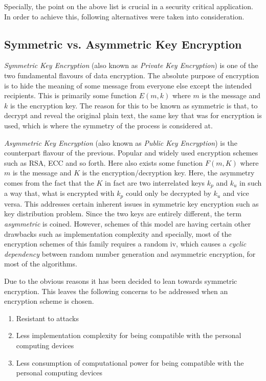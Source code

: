 Specially, the  point on the above list is crucial in a security critical application. In order to achieve this, following alternatives were taken into consideration.

\subsection{Symmetric vs. Asymmetric Key Encryption}

\textit{Symmetric Key Encryption} (also known as \textit{Private Key Encryption}) is one of the two fundamental flavours of data encryption. The absolute purpose of encryption is to hide the meaning of some message from everyone else except the intended recipients. This is primarily some function $E(m,k)$ where $m$ is the message and $k$ is the encryption key. The reason for this to be known as symmetric is that, to decrypt and reveal the original plain text, the same key that was for encryption is used, which is where the symmetry of the process is considered at.

\textit{Asymmetric Key Encryption} (also known as \textit{Public Key Encryption}) is the counterpart flavour of the previous. Popular and widely used encryption schemes such as RSA, ECC and so forth. Here also exists some function $F(m,K)$ where $m$ is the message and $K$ is the encryption/decryption key. Here, the asymmetry comes from the fact that the $K$ in fact are two interrelated keys $k_p$ and $k_u$ in such a way that, what is encrypted with $k_p$ could only be decrypted by $k_u$ and vice versa. This addresses certain inherent issues in symmetric key encryption such as key distribution problem. Since the two keys are entirely different, the term \textit{asymmetric} is coined. However, schemes of this model are having certain other drawbacks such as implementation complexity and specially, most of the encryption schemes of this family requires a random \acrfull{iv}, which causes a \textit{cyclic dependency} between random number generation and asymmetric encryption, for most of the algorithms.

Due to the obvious reasons it has been decided to lean towards symmetric encryption. This leaves the following concerns to be addressed when an encryption scheme is chosen.

\begin{enumerate}
    \item Resistant to attacks
    \item Less implementation complexity for being compatible with the personal computing devices
    \item Less consumption of computational power for being compatible with the personal computing devices
\end{enumerate}

